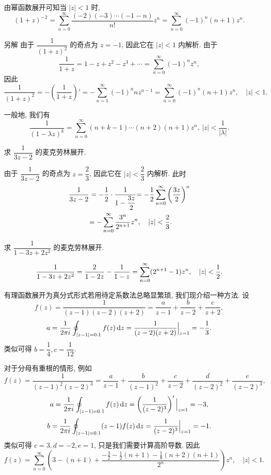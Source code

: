 \begin{solution}
	由幂函数展开可知当 $|z|<1$ 时,
	\[(1+z)^{-2}=\sum_{n=0}^\infty \frac{(-2)(-3)\cdots(-1-n)}{n!}z^n
	{=\sum_{n=0}^\infty (-1)^n(n+1)z^n.}\]
\end{solution}

\begin{solution}{另解}
	由于 $\dfrac1{(1+z)^2}$ 的奇点为 $z=-1$, 因此它在 $|z|<1$ 内解析.
	{由于
		\[\frac1{1+z}=1-z+z^2-z^3+\cdots=\sum_{n=0}^\infty (-1)^nz^n,\]因此
		\[
		\frac1{(1+z)^2}=-\left(\frac1{1+z}\right)'
		{=-\sum_{n=1}^\infty(-1)^n nz^{n-1}}
		{=\sum_{n=0}^\infty(-1)^n (n+1)z^n,\quad |z|<1.}
		\]
	}
\end{solution}
一般地, 我们有
\[\frac1{(1-\lambda z)^k}=\sum_{n=0}^\infty(n+k-1)\cdots(n+2)(n+1)z^n,\ |z|<\frac1{|\lambda|}.\]

\begin{example}
	求 $\dfrac1{3z-2}$ 的麦克劳林展开.
\end{example}

\begin{solution}
	由于 $\dfrac1{3z-2}$ 的奇点为 $z=\dfrac23$, 因此它在 $|z|<\dfrac23$ 内解析.
	{此时
	\begin{align*}
		\frac1{3z-2}&=-\frac{1}{2}\cdot\frac1{1-\dfrac{3z}2}
			{=-\frac{1}{2}\sum_{n=0}^\infty\left(\frac{3z}2\right)^n}\\
		&{=-\sum_{n=0}^\infty\frac{3^n}{2^{n+1}}z^n,\quad|z|<\frac23.}
	\end{align*}}
\end{solution}

\begin{exercise}
	求 $\dfrac1{1-3z+2z^2}$ 的麦克劳林展开.
\end{exercise}

\begin{answer}
\[
	\frac1{1-3z+2z^2}=\frac{2}{1-2z}-\frac1{1-z}
	=\sum_{n=0}^\infty(2^{n+1}-1)z^n,\quad |z|<\frac{1}{2} .
\]
\end{answer}

有理函数展开为真分式形式若用待定系数法总略显繁琐, 我们现介绍一种方法.
设
\[f(z)=\dfrac{1}{(z-1)(z-2)(z+2)}=\frac{a}{z-1}+\frac{b}{z-2}+\frac{c}{z+2},\]
\[a=\frac1{2\pi i} \oint_{|z-1|=0.1}f(z)\,\mathrm{d} z=\dfrac{1}{(z-2)(z+2)}\Big|_{z=1}=-\frac13.\]
类似可得 $b=\dfrac14,c=\dfrac1{12}$.

对于分母有重根的情形, 例如
\[f(z)=\dfrac{1}{(z-1)^2(z-2)^3}=\frac{a}{z-1}+\frac{b}{(z-1)^2}+\frac{c}{z-2}+\frac{d}{(z-2)^2}+\frac{e}{(z-2)^3},\]
\[a=\frac1{2\pi i} \oint_{|z-1|=0.1}f(z)\,\mathrm{d} z=\left(\dfrac{1}{(z-2)^3}\right)'\Big|_{z=1}=-3,\]
\[b=\frac1{2\pi i} \oint_{|z-1|=0.1}(z-1)f(z)\,\mathrm{d} z=\dfrac{1}{(z-2)^3}\Big|_{z=1}=-1.\]
类似可得 $c=3,d=-2,e=1$, 只是我们需要计算高阶导数.
因此
\[f(z)=\sum_{n=0}^\infty\left(3-(n+1)+\frac{-\frac32-\frac12(n+1)-\frac18(n+2)(n+1)}{2^n}\right)z^n,\quad |z|<1.\]

